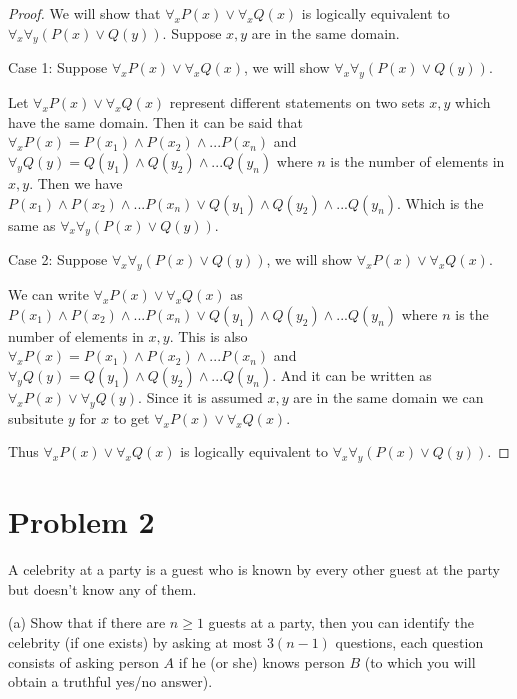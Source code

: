 \documentclass{article}
\begin{document}
    \begin{proof}
        We will show that $\forall_x P(x) \lor \forall_x Q(x)$
        is logically equivalent to $\forall_x\forall_y (P(x)\lor Q(y))$. Suppose $x,y$ are in the same domain.

        Case 1: Suppose $\forall_x P(x) \lor \forall_x Q(x)$, we will show 
        $\forall_x\forall_y (P(x)\lor Q(y))$.

        Let $\forall_x P(x)\lor\forall_x Q(x)$ represent different statements on two sets $x,y$ which have the same domain. Then it can be said that $\forall_x P(x) = P(x_1)\land P(x_2) \land ... P(x_n)$ and $\forall_y Q(y) = Q(y_1)\land Q(y_2)\land ... Q(y_n)$ where $n$ is the number of elements in $x,y$.
        Then we have $P(x_1)\land P(x_2) \land ... P(x_n)\lor Q(y_1)\land Q(y_2)\land ... Q(y_n)$. Which is the same as $\forall_x\forall_y (P(x)\lor Q(y))$.

        Case 2: Suppose $\forall_x\forall_y (P(x)\lor Q(y))$, we will show 
        $\forall_x P(x) \lor \forall_x Q(x)$.

        We can write $\forall_x P(x) \lor \forall_x Q(x)$ as $P(x_1)\land P(x_2) \land ... P(x_n)\lor Q(y_1)\land Q(y_2)\land ... Q(y_n)$ where $n$ is the number of elements in $x,y$. This is also $\forall_x P(x) = P(x_1)\land P(x_2) \land ... P(x_n)$ and $\forall_y Q(y) = Q(y_1)\land Q(y_2)\land ... Q(y_n)$.
        And it can be written as $\forall_x P(x)\lor\forall_y Q(y)$. Since it is assumed $x,y$ are in the same domain we can subsitute $y$ for $x$ to get $\forall_x P(x)\lor\forall_x Q(x)$.

        Thus $\forall_x P(x) \lor \forall_x Q(x)$
        is logically equivalent to $\forall_x\forall_y (P(x)\lor Q(y))$.

    \end{proof}



    \section*{Problem 2}

    A celebrity at a party is a guest who is known by every other guest at the party but doesn't know any of them.

    (a) Show that if there are $n\geq 1$ guests at a party, then you can identify the celebrity (if one exists) by asking at most $3(n-1)$ questions, each question consists of asking person $A$ if he (or she) knows person $B$ (to which you will obtain a truthful yes/no answer).
\end{document}
